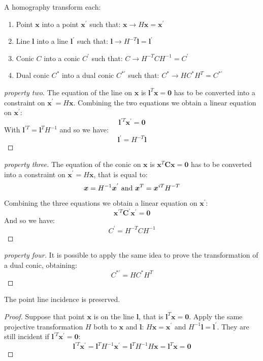 \documentclass[12pt, a4paper]{report}
\newtheorem[style=M,bodystyle=\normalfont]{theorem}{Theorem}
\newtheorem[style=M,bodystyle=\normalfont]{corollary}{Corollary}
\newtheorem[style=M,bodystyle=\normalfont]{lemma}{Lemma}
\newtheorem[style=M,bodystyle=\normalfont]{definition}{Definition}
\begin{document}
    \begin{definition}
        A homography transform each: 
        \begin{enumerate}
            \item Point $\boldsymbol{x}$ into a point $\boldsymbol{x}^{'}$ such that: $\boldsymbol{x} \rightarrow H \boldsymbol{x}=\boldsymbol{x}^{'}$
            \item Line $\boldsymbol{l}$ into a line $\boldsymbol{l}^{'}$ such that: $\boldsymbol{l} \rightarrow H^{-T} \boldsymbol{l}=\boldsymbol{l}^{'}$
            \item Conic $C$ into a conic $C^{'}$ such that: $C \rightarrow H^{-T} CH^{-1}=C^{'}$
            \item Dual conic $C^{*}$ into a dual conic $C^{*'}$ such that: $C^{*} \rightarrow H C^{*}H^{T}=C^{*'}$
        \end{enumerate}
    \end{definition}
    \begin{proof}[property two]
        The equation of the line on $\boldsymbol{x}$ is $\boldsymbol{l}^T\boldsymbol{x}=\boldsymbol{0}$ has to be converted into a constraint on $\boldsymbol{x}^{'} = H \boldsymbol{x}$. Combining the two 
        equations we obtain a linear equation on $\boldsymbol{x}^{'}$: 
        \[\boldsymbol{l}^{'T}\boldsymbol{x}^{'}=\boldsymbol{0}\]
        With $\boldsymbol{l}^{'T}=\boldsymbol{l}^{T}H^{-1}$ and so we have: 
        \[\boldsymbol{l}^{'}=H^{-T}\boldsymbol{l}\]
    \end{proof}
    \begin{proof}[property three]
        The equation of the conic on $\boldsymbol{x}$ is $\boldsymbol{x}^{T}\boldsymbol{C}\boldsymbol{x}=\boldsymbol{0}$ has to be converted into a constraint on $\boldsymbol{x}^{'} = H \boldsymbol{x}$, that 
        is equal to:
        \[\boldsymbol{x}=H^{-1}\boldsymbol{x}^{'} \textnormal{ and } \boldsymbol{x}^{T}=\boldsymbol{x}^{iT}H^{-T}\]
        Combining the three equations we obtain a linear equation on $\boldsymbol{x}^{'}$: 
        \[\boldsymbol{x}^{'T}\boldsymbol{C}^{'}\boldsymbol{x}^{'}=\boldsymbol{0}\]
        And so we have: 
        \[C^{'}=H^{-T} CH^{-1}\]
    \end{proof}
    \begin{proof}[property four]
        It is possible to apply the same idea to prove the transformation of a dual conic, obtaining:
        \[C^{*'}=H C^{*}H^{T}\]
    \end{proof}
    The point line incidence is preserved. 
    \begin{proof}
        Suppose that point $\boldsymbol{x}$ is on the line $\boldsymbol{l}$, that is $\boldsymbol{l}^T\boldsymbol{x}=\boldsymbol{0}$. Apply the same projective transformation $H$ both to $\boldsymbol{x}$ 
        and $\boldsymbol{l}$: $H\boldsymbol{x}=\boldsymbol{x}^{'}$ and $H^{-1}\boldsymbol{l}=\boldsymbol{l}^{'}$. They are still incident if $\boldsymbol{l}^{'T}\boldsymbol{x}^{'}=\boldsymbol{0}$:
        \[\boldsymbol{l}^{'T}\boldsymbol{x}^{'}=\boldsymbol{l}^{T}H^{-1}\boldsymbol{x}^{'}=\boldsymbol{l}^{T}H^{-1}H\boldsymbol{x}=\boldsymbol{l}^{T}\boldsymbol{x}=\boldsymbol{0}\]
    \end{proof}
\end{document}
